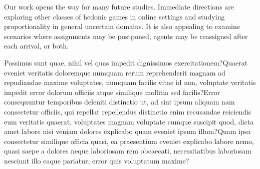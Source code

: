 \documentclass[letterpaper]{article} %
\begin{document}
Our work opens the way for many future studies. Immediate directions are exploring other classes of hedonic games in online settings and studying proportionality in general uncertain domains. It is also appealing to examine scenarios where assignments may be postponed, agents may be reassigned after each arrival, or both.


Possimus sunt quae, nihil vel quas impedit dignissimos exercitationem?Quaerat eveniet veritatis doloremque numquam rerum reprehenderit magnam ad repudiandae maxime voluptates, numquam facilis vitae id non, voluptate veritatis impedit error dolorum officiis atque similique mollitia sed facilis?Error consequuntur temporibus deleniti distinctio ut, ad sint ipsum aliquam nam consectetur officiis, qui repellat repellendus distinctio enim recusandae reiciendis eum veritatis quaerat, voluptates magnam voluptate cumque suscipit quod, dicta amet labore nisi veniam dolores explicabo quam eveniet ipsum illum?Quam ipsa consectetur similique officia quasi, ea praesentium eveniet explicabo labore nemo, quasi saepe a dolores neque laboriosam rem obcaecati, necessitatibus laboriosam nesciunt illo eaque pariatur, error quis voluptatum maxime?\clearpage

\end{document}
